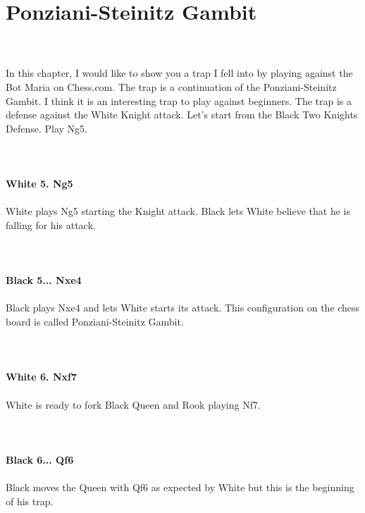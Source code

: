 \documentclass{article}
\begin{document}
\section{ Ponziani-Steinitz Gambit}

\\
\\
In this chapter, I would like to show you a trap I fell into by playing against the Bot Maria on Chess.com. The trap is a continuation of the Ponziani-Steinitz Gambit. I think it is an interesting trap to play against beginners. The trap is a defense against the White Knight attack. Let's start from the Black Two Knights Defense. Play Ng5.\\
\\

\\
\\
\textbf{White 5. Ng5}\\
\\
White plays Ng5 starting the Knight attack. Black lets White believe that he is falling for his attack.\\
\\

\\
\\
\textbf{Black 5... Nxe4}\\
\\
Black plays Nxe4 and lets White starts its attack. This configuration on the chess board is called Ponziani-Steinitz Gambit.\\
\\

\\
\\
\textbf{White 6. Nxf7}\\
\\
White is ready to fork Black Queen and Rook playing Nf7.\\
\\

\\
\\
\textbf{Black 6... Qf6}\\
\\
Black moves the Queen with Qf6 as expected by White but this is the beginning of his trap.\\
\\

\\
\end{document}

